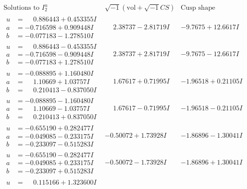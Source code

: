\documentclass[1p]{elsarticle_modified}
\theoremstyle{definition}
\newcommand{\I}{\sqrt{-1}}
\begin{document}
$$\begin{array}{c|c|c}  
\text{Solutions to }I^u_{2}& \I (\text{vol} + \sqrt{-1}CS) & \text{Cusp shape}\\
 \hline 
\begin{aligned}
u &= \phantom{-}0.886443 + 0.453355 I \\
a &= -0.716598 + 0.909448 I \\
b &= -0.077183 - 1.278510 I\end{aligned}
 & \phantom{-}2.38737 - 2.81719 I & -9.7675 + 12.6617 I \\ \hline\begin{aligned}
u &= \phantom{-}0.886443 - 0.453355 I \\
a &= -0.716598 - 0.909448 I \\
b &= -0.077183 + 1.278510 I\end{aligned}
 & \phantom{-}2.38737 + 2.81719 I & -9.7675 - 12.6617 I \\ \hline\begin{aligned}
u &= -0.088895 + 1.160480 I \\
a &= \phantom{-}1.10669 + 1.03757 I \\
b &= \phantom{-}0.210413 - 0.837050 I\end{aligned}
 & \phantom{-}1.67617 + 0.71995 I & -1.96518 + 0.21105 I \\ \hline\begin{aligned}
u &= -0.088895 - 1.160480 I \\
a &= \phantom{-}1.10669 - 1.03757 I \\
b &= \phantom{-}0.210413 + 0.837050 I\end{aligned}
 & \phantom{-}1.67617 - 0.71995 I & -1.96518 - 0.21105 I \\ \hline\begin{aligned}
u &= -0.655190 + 0.282477 I \\
a &= -0.049085 - 0.233175 I \\
b &= -0.233097 - 0.515283 I\end{aligned}
 & -0.50072 + 1.73928 I & -1.86896 - 1.30041 I \\ \hline\begin{aligned}
u &= -0.655190 - 0.282477 I \\
a &= -0.049085 + 0.233175 I \\
b &= -0.233097 + 0.515283 I\end{aligned}
 & -0.50072 - 1.73928 I & -1.86896 + 1.30041 I \\ \hline\begin{aligned}
u &= \phantom{-}0.115166 + 1.323600 I \\

\end{aligned}
\end{array}$$
\end{document}
